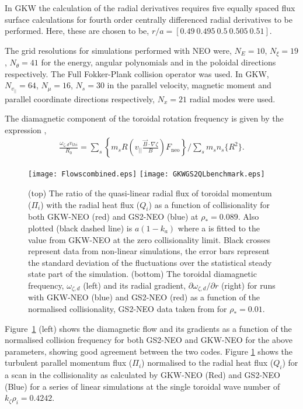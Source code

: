 In {\small GKW} the calculation of the radial derivatives requires five equally spaced flux surface calculations for fourth order centrally differenced radial derivatives to be performed.  Here, these are chosen to be, $r/a = [0.49\ 0.495\ 0.5\ 0.505\ 0.51]$. 

The grid resolutions for simulations performed with NEO were, $N_{E}=10$, $N_{\xi}=19$, $N_{\theta}=41$ for the energy, angular polynomials and in the poloidal directions respectively. The Full Fokker-Plank collision operator was used.  In GKW, $N_{v_{||}}=64$, $N_{\mu}=16$, $N_{s}= 30$ in the parallel velocity, magnetic moment and parallel coordinate directions respectively,  $N_{x}=21$ radial modes were used.

The diamagnetic component of the toroidal rotation frequency is given by the expression \cite{BarnesParra13},
\begin{eqnarray}
\frac{\omega_{\zeta,d}v_{th i}}{R_{0}} =
\sum_{s} \left\{ m_{s}R\left(v_{||}\frac{\vec{B}\cdot\nabla\zeta}{B}\right)F_{\mbox{neo}}\right\}/\sum_{s}m_{s}n_{s}\{ R^{2}\}.
\end{eqnarray}
\begin{figure}
\begin{centering}
\texttt{[image: Flowscombined.eps]}
\texttt{[image: GKWGS2QLbenchmark.eps]}
\caption{(top) The ratio of the quasi-linear radial flux of toroidal momentum ($\Pi_{i}$) with the radial heat flux ($Q_{i}$) as a function of collisionality for both GKW-NEO (red) and GS2-NEO (blue) at $\rho_{*}=0.089$.  Also plotted (black dashed line) is $a(1-k_{a})$ where a is fitted to the value from GKW-NEO at the zero collisionality limit.  Black crosses represent data from non-linear simulations, the error bars represent the standard deviation of the fluctuations over the statistical steady state part of the simulation.  (bottom) The toroidal diamagnetic frequency, $\omega_{\zeta,d}$ (left) and its radial gradient, $\partial\omega_{\zeta,d}/\partial r$ (right) for runs with GKW-NEO (blue) and GS2-NEO (red) as a function of the normalised collisionality, GS2-NEO data taken from \cite{BarnesParra13} for $\rho_{*}=0.01$. }
\label{neo:gkwgs2comp}
\end{centering}
\end{figure}

Figure~\ref{neo:gkwgs2comp} (left) shows the diamagnetic flow and its gradients as a function of the normalised collision frequency for both GS2-NEO and GKW-NEO for the above parameters, showing good agreement between the two codes.   Figure \ref{neo:gkwgs2comp} shows the turbulent parallel momentum flux ($\Pi_{i}$) normalised to the radial heat flux ($Q_{i}$) for a scan in the collisionality as calculated by GKW-NEO (Red) and GS2-NEO (Blue) for a series of linear simulations at the single toroidal wave number of $k_{\zeta}\rho_{i} =0.4242$. 

